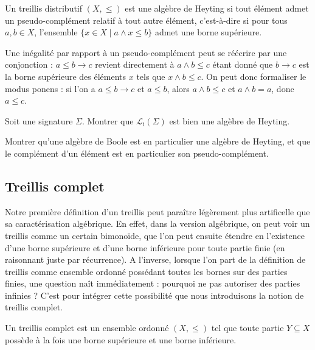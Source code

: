 \begin{definition}
  Un treillis distributif $(X,\leq)$ est une algèbre de Heyting si tout élément
  admet un pseudo-complément relatif à tout autre élément, c'est-à-dire si
  pour tous $a,b\in X$, l'ensemble $\{x\in X \mid a \land x \leq b\}$ admet une
  borne supérieure.
\end{definition}

\begin{remark}
  Une inégalité par rapport à un pseudo-complément peut se réécrire par une
  conjonction : $a\leq b \to c$ revient directement à $a\land b \leq c$ étant
  donné que $b \to c$ est la borne supérieure des éléments $x$ tels que
  $x\land b \leq c$. On peut donc formaliser le modus ponens : si l'on a
  $a\leq b \to c$ et $a\leq b$, alors $a\land b \leq c$ et $a\land b = a$, donc
  $a\leq c$.
\end{remark}

\begin{exercise}
  Soit une signature $\Sigma$. Montrer que $\mathcal L_\mathrm i(\Sigma)$ est
  bien une algèbre de Heyting.
\end{exercise}

\begin{exercise}
  Montrer qu'une algèbre de Boole est en particulier une algèbre de Heyting, et
  que le complément d'un élément est en particulier son pseudo-complément.
\end{exercise}

\subsection{Treillis complet}

Notre première définition d'un treillis peut paraître légèrement plus
artificelle que sa caractérisation algébrique. En effet, dans la version
algébrique, on peut voir un treillis comme un certain bimonoïde, que l'on peut
ensuite étendre en l'existence d'une borne supérieure et d'une borne inférieure
pour toute partie finie (en raisonnant juste par récurrence). A l'inverse,
lorsque l'on part de la définition de treillis comme ensemble ordonné possédant
toutes les bornes sur des parties finies, une question naît immédiatement :
pourquoi ne pas autoriser des parties infinies ? C'est pour intégrer cette
possibilité que nous introduisons la notion de treillis complet.

\begin{definition}
  Un treillis complet est un ensemble ordonné $(X,\leq)$ tel que toute partie
  $Y\subseteq X$ possède à la fois une borne supérieure et une borne inférieure.
\end{definition}

